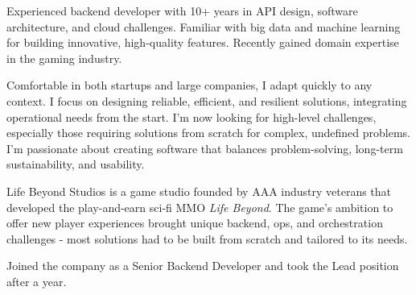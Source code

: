 \documentclass[10pt, a4paper, ragged2e]{altacv}
\begin{document}
\sloppy
{}

\begin{adjustwidth}{-3.7cm}{}
\makecvheader
\end{adjustwidth}

	Experienced backend developer with 10+ years in API design, software architecture, and cloud challenges. Familiar with big data and machine learning for building innovative, high-quality features. Recently gained domain expertise in the gaming industry.

	\smallskip
	Comfortable in both startups and large companies, I adapt quickly to any context. I focus on designing reliable, efficient, and resilient solutions, integrating operational needs from the start.
	I'm now looking for high-level challenges, especially those requiring solutions from scratch for complex, undefined problems. I'm passionate about creating software that balances problem-solving, long-term sustainability, and usability.


\medskip
{}
		
		Life Beyond Studios is a game studio founded by AAA industry veterans that developed the play-and-earn sci-fi MMO \emph{Life Beyond}.
		The game's ambition to offer new player experiences brought unique backend, ops, and orchestration challenges - most solutions had to be built from scratch and tailored to its needs.

		\smallskip
		Joined the company as a Senior Backend Developer and took the Lead position after a year.
\end{document}
